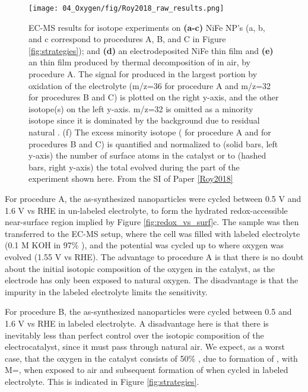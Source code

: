 \begin{figure}[h!]
	\centering
	\texttt{[image: 04\_Oxygen/fig/Roy2018\_raw\_results.png]}
	\caption{EC-MS results for isotope experiments on \textbf{(a-c)} NiFe NP’s (a, b, and c correspond to procedures A, B, and C in Figure \ref{fig:strategies}); and \textbf{(d)} an electrodeposited NiFe thin film and \textbf{(e)} an  thin film produced by thermal decomposition of  in air, by procedure A. The signal for  produced in the largest portion by oxidation of the electrolyte (m/z=36 for procedure A and m/z=32 for procedures B and C) is plotted on the right y-axis, and the other  isotope(s) on the left y-axis. m/z=32 is omitted as a minority isotope since it is dominated by the background due to residual natural . (f) The excess minority isotope ( for procedure A and  for procedures B and C) is quantified and normalized to (solid bars, left y-axis) the number of surface atoms in the catalyst or to (hashed bars, right y-axis) the total  evolved during the part of the experiment shown here. From the SI of Paper \ref{Roy2018}}
	\label{fig:Roy2018_raw_results}
\end{figure}

For procedure A, the as-synthesized nanoparticles were cycled between 0.5 V and 1.6 V vs RHE in un-labeled electrolyte, to form the hydrated redox-accessible near-surface region implied by Figure \ref{fig:redox_vs_surf}c. The sample was then transferred to the EC-MS setup, where the cell was filled with labeled electrolyte (0.1 M KOH in 97\% ), and the potential was cycled up to where oxygen was evolved (1.55 V vs RHE). The advantage to procedure A is that there is no doubt about the initial isotopic composition of the oxygen in the catalyst, as the electrode has only been exposed to natural oxygen. The disadvantage is that the  impurity in the labeled electrolyte limits the sensitivity. 

For procedure B, the as-synthesized nanoparticles were cycled between 0.5 and 1.6 V vs RHE in labeled electrolyte. A disadvantage here is that there is inevitably less than perfect control over the isotopic composition of the electrocatalyst, since it must pass through natural air. We expect, as a worst case, that the oxygen in the catalyst consists of 50\% , due to formation of , with M=, when exposed to air and subsequent formation of  when cycled in labeled electrolyte. This is indicated in Figure \ref{fig:strategies}.

